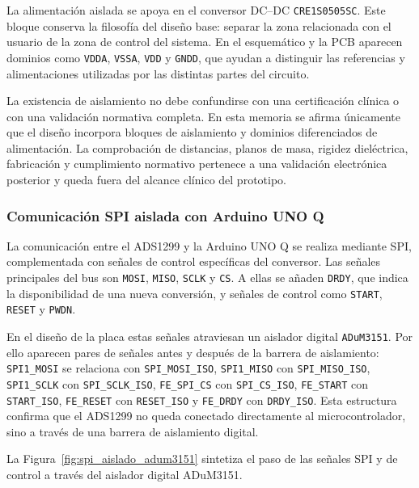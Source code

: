 La alimentación aislada se apoya en el conversor DC--DC \texttt{CRE1S0505SC}. Este bloque conserva la filosofía del diseño base: separar la zona relacionada con el usuario de la zona de control del sistema. En el esquemático y la PCB aparecen dominios como \texttt{VDDA}, \texttt{VSSA}, \texttt{VDD} y \texttt{GNDD}, que ayudan a distinguir las referencias y alimentaciones utilizadas por las distintas partes del circuito.

La existencia de aislamiento no debe confundirse con una certificación clínica o con una validación normativa completa. En esta memoria se afirma únicamente que el diseño incorpora bloques de aislamiento y dominios diferenciados de alimentación. La comprobación de distancias, planos de masa, rigidez dieléctrica, fabricación y cumplimiento normativo pertenece a una validación electrónica posterior y queda fuera del alcance clínico del prototipo.

\subsubsection{Comunicación SPI aislada con Arduino UNO Q}

La comunicación entre el ADS1299 y la Arduino UNO Q se realiza mediante SPI, complementada con señales de control específicas del conversor. Las señales principales del bus son \texttt{MOSI}, \texttt{MISO}, \texttt{SCLK} y \texttt{CS}. A ellas se añaden \texttt{DRDY}, que indica la disponibilidad de una nueva conversión, y señales de control como \texttt{START}, \texttt{RESET} y \texttt{PWDN}.

En el diseño de la placa estas señales atraviesan un aislador digital \texttt{ADuM3151}. Por ello aparecen pares de señales antes y después de la barrera de aislamiento: \texttt{SPI1\_MOSI} se relaciona con \texttt{SPI\_MOSI\_ISO}, \texttt{SPI1\_MISO} con \texttt{SPI\_MISO\_ISO}, \texttt{SPI1\_SCLK} con \texttt{SPI\_SCLK\_ISO}, \texttt{FE\_SPI\_CS} con \texttt{SPI\_CS\_ISO}, \texttt{FE\_START} con \texttt{START\_ISO}, \texttt{FE\_RESET} con \texttt{RESET\_ISO} y \texttt{FE\_DRDY} con \texttt{DRDY\_ISO}. Esta estructura confirma que el ADS1299 no queda conectado directamente al microcontrolador, sino a través de una barrera de aislamiento digital.

La Figura~\ref{fig:spi_aislado_adum3151} sintetiza el paso de las señales SPI y de control a través del aislador digital ADuM3151.

